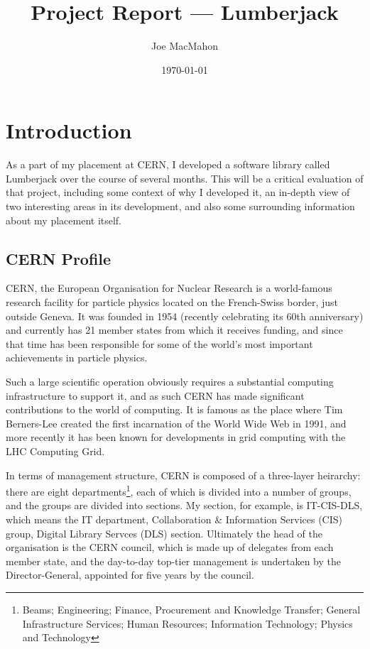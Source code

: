 \documentclass[a4paper,11pt]{article} %
\title{Project Report --- Lumberjack}
\author{Joe MacMahon}
\date{\today}
\begin{document}
\maketitle

\section{Introduction}
\label{sec:introduction}
As a part of my placement at CERN, I developed a software library called
Lumberjack over the course of several months.  This will be a critical
evaluation of that project, including some context of why I developed it, an
in-depth view of two interesting areas in its development, and also some
surrounding information about my placement itself.

\subsection{CERN Profile}
\label{sec:cern}
CERN, the European Organisation for Nuclear Research is a world-famous research
facility for particle physics located on the French-Swiss border, just outside
Geneva.  It was founded in 1954 (recently celebrating its 60th anniversary) and
currently has 21 member states from which it receives funding, and since that
time has been responsible for some of the world's most important achievements
in particle physics.

Such a large scientific operation obviously requires a substantial computing
infrastructure to support it, and as such CERN has made significant
contributions to the world of computing.  It is famous as the place where Tim
Berners-Lee created the first incarnation of the World Wide Web in 1991, and
more recently it has been known for developments in grid computing with the LHC
Computing Grid.

In terms of management structure, CERN is composed of a three-layer heirarchy:
there are eight departments\footnote{Beams; Engineering; Finance, Procurement
  and Knowledge Transfer; General Infrastructure Services; Human Resources;
  Information Technology; Physics and Technology}, each of which is divided
into a number of groups, and the groups are divided into sections.  My section,
for example, is IT-CIS-DLS, which means the IT department, Collaboration \&
Information Services (CIS) group, Digital Library Servces (DLS) section.
Ultimately the head of the organisation is the CERN council, which is made up
of delegates from each member state, and the day-to-day top-tier management is
undertaken by the Director-General, appointed for five years by the council.
\end{document}
